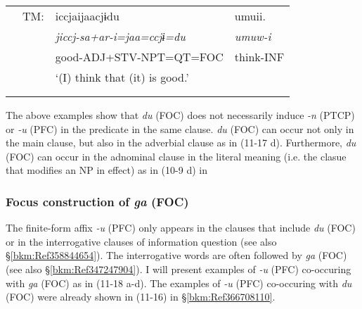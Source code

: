 \begin{tabularx}{\textwidth}{XXXXXXXXXXXXX}
& { TM:} & \multicolumn{6}{X}{{ iccjaijaacjɨdu}} & \multicolumn{5}{X}{{ umuii.}}\\
&  & \multicolumn{6}{X}{{ \textit{jiccj}\footnotemark{}\textit{{}-sa+ar-i=jaa=ccjɨ=du}}} & \multicolumn{5}{X}{{ \textit{umuw-i}}}\\
&  & \multicolumn{6}{X}{{ good-ADJ+STV-NPT=QT=FOC}} & \multicolumn{5}{X}{{ think-INF}}\\
&  & \multicolumn{11}{X}{{ ‘(I) think that (it) is good.’}}\\
&  & \multicolumn{11}{X}{\raggedleft [Co: 120415\_01.txt]}\\
\lspbottomrule
\end{tabularx}
\addtocounter{footnote}{-2}

The above examples show that \textit{du} (FOC) does not necessarily induce \textit{{}-n} (PTCP) or \textit{{}-u} (PFC) in the predicate in the same clause. \textit{du} (FOC) can occur not only in the main clause, but also in the adverbial clause as in (11-17 d). Furthermore, \textit{du} (FOC) can occur in the adnominal clause in the literal meaning (i.e. the clasue that modifies an NP in effect) as in (10-9 d) in 

\subsubsection{Focus construction of \textit{ga} (FOC)}
\label{bkm:Ref366708117}\hypertarget{RefHeadingToc395697263}{}
The finite-form affix \textit{{}-u} (PFC) only appears in the clauses that include \textit{du} (FOC) or in the interrogative clauses of information question (see also §\ref{bkm:Ref358844654}). The interrogative words are often followed by \textit{ga} (FOC) (see also §\ref{bkm:Ref347247904}). I will present examples of \textit{{}-u} (PFC) co-occuring with \textit{ga} (FOC) as in (11-18 a-d). The examples of \textit{-u} (PFC) co-occuring with \textit{du} (FOC) were already shown in (11-16) in §\ref{bkm:Ref366708110}.

\tablefirsthead{}

